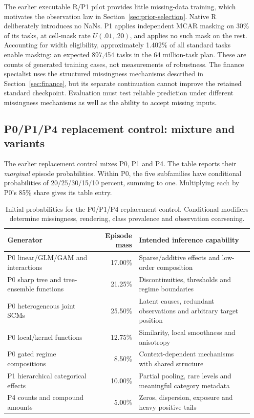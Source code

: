 \documentclass[11pt]{article}
\begin{document}
The earlier executable R/P1 pilot provides little missing-data training, which motivates the observation law in Section~\ref{sec:prior-selection}. Native R deliberately introduces no NaNs. P1 applies independent MCAR masking on 30\% of its tasks, at cell-mask rate $U(.01,.20)$, and applies no such mask on the rest. Accounting for width eligibility, approximately 1.402\% of all standard tasks enable masking: an expected 897,454 tasks in the 64 million-task plan. These are counts of generated training cases, not measurements of robustness. The finance specialist uses the structured missingness mechanisms described in Section~\ref{sec:finance}, but its separate continuation cannot improve the retained standard checkpoint. Evaluation must test reliable prediction under different missingness mechanisms as well as the ability to accept missing inputs.

\subsection{P0/P1/P4 replacement control: mixture and variants}

The earlier replacement control mixes P0, P1 and P4. The table reports their \emph{marginal} episode probabilities. Within P0, the five subfamilies have conditional probabilities of 20/25/30/15/10 percent, summing to one. Multiplying each by P0's 85\% share gives its table entry.
\begin{table}[ht]
\centering\small
\begin{tabularx}{\linewidth}{@{}lrY@{}}
\toprule
Generator & Episode mass & Intended inference capability\\
\midrule
P0 linear/GLM/GAM and interactions & 17.00\% & Sparse/additive effects and low-order composition\\
P0 sharp tree and tree-ensemble functions & 21.25\% & Discontinuities, thresholds and regime boundaries\\
P0 heterogeneous joint SCMs & 25.50\% & Latent causes, redundant observations and arbitrary target position\\
P0 local/kernel functions & 12.75\% & Similarity, local smoothness and anisotropy\\
P0 gated regime compositions & 8.50\% & Context-dependent mechanisms with shared structure\\
P1 hierarchical categorical effects & 10.00\% & Partial pooling, rare levels and meaningful category metadata\\
P4 counts and compound amounts & 5.00\% & Zeros, dispersion, exposure and heavy positive tails\\
\bottomrule
\end{tabularx}
\caption{Initial probabilities for the P0/P1/P4 replacement control. Conditional modifiers determine missingness, rendering, class prevalence and observation coarsening.}
\end{table}
\end{document}
